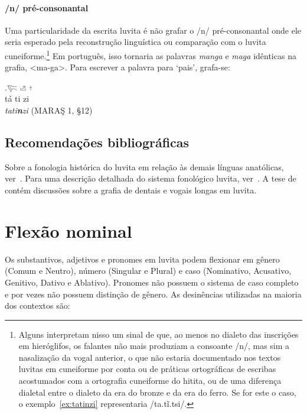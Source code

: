 \paragraph{/n/ pré\hyp{}consonantal}
Uma particularidade da escrita luvita é não grafar o /n/
pré\hyp{}consonantal onde ele seria esperado pela reconstrução linguística ou
comparação com o luvita cuneiforme.\footnote{%
	Alguns interpretam nisso um sinal de que, ao menos no dialeto das inscrições
	em hieróglifos, os falantes não mais produziam a consoante /n/, mas sim
	a nasalização da vogal anterior, o que não estaria documentado nos textos
	luvitas em cuneiforme por conta ou de práticas ortográficas de escribas
	acostumados com a ortografia cuneiforme do hitita, ou de uma diferença
	dialetal entre o dialeto da era do bronze e da era do ferro. Se for este o
	caso, o exemplo~\ref{ex:tatinzi} representaria /ta.tĩ.tsi/.}
Em português, isso tornaria as palavras \emph{manga} e \emph{maga} idênticas na
grafia, <ma-ga>.
Para escrever a palavra para `pais', grafa-se:

\exg.\label{ex:tatinzi}\Large 𔐞 \Large 𔑣 \Large 𔖩\\
tá ti zi\\
\emph{tati\textbf{n}zi}  (MARAŞ 1, §12)



\subsection{Recomendações bibliográficas}

Sobre a fonologia histórica do luvita em relação às demais línguas anatólicas,
ver~\citet[p. 229ff.]{Melchert1994}.
Para uma descrição detalhada do sistema fonológico luvita,
ver~\citet[p. 177ff.]{MelchertLanguage}.
A tese de~\citet{Vertegaal2020} contém discussões sobre a grafia de dentais e
vogais longas em luvita.

\section{Flexão nominal}

Os substantivos, adjetivos e pronomes em luvita podem flexionar em gênero (Comum e Neutro),
número (Singular e Plural) e caso (Nominativo, Acusativo, Genitivo, Dativo e
Ablativo).
Pronomes não possuem o sistema de caso completo e por vezes não possuem
distinção de gênero.
As desinências utilizadas na maioria dos contextos são:

